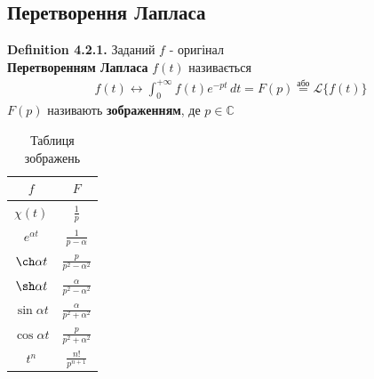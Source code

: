 \documentclass[a4paper, 14pt]{extarticle}
\def\hugespace{\vspace{5mm} \\}
\begin{document}
\subsection{Перетворення Лапласа}
\textbf{Definition 4.2.1.} Заданий $f$ - оригінал\\
\textbf{Перетворенням Лапласа} $f(t)$ називається
\begin{align*}
f(t) \leftrightarrow \int_0^{+\infty} f(t)e^{-pt}\,dt = F(p) \overset{\textrm{або}}{=} \mathscr{L}\{f(t)\}
\end{align*}
$F(p)$ називають \textbf{зображенням}, де $p \in \mathbb{C}$
\hugespace
\begin{table}[h!]
\begin{center}
\begin{tabular}{ c|c }
 $f$ & $F$ \\
 \hline
 $\chi(t)$ & $\displaystyle \frac{1}{p}$ \\
 \hline
 $e^{\alpha t}$ & $\displaystyle \frac{1}{p- \alpha}$\\
 \hline
 $\ch \alpha t$ & $\displaystyle \frac{p}{p^2-\alpha^2}$\\
 \hline
 $\sh \alpha t$ & $\displaystyle \frac{\alpha}{p^2-\alpha^2}$\\
 \hline
 $\sin \alpha t$ & $\displaystyle \frac{\alpha}{p^2 + \alpha^2}$\\
 \hline
 $\cos \alpha t$ & $\displaystyle \frac{p}{p^2 + \alpha^2}$\\
 \hline
 $t^n$ & $\displaystyle \frac{n!}{p^{n+1}}$ \\
\end{tabular}
	    \caption{Таблиця зображень}
    		\label{tab:table1}
\end{center}
\end{table}
\end{document}
